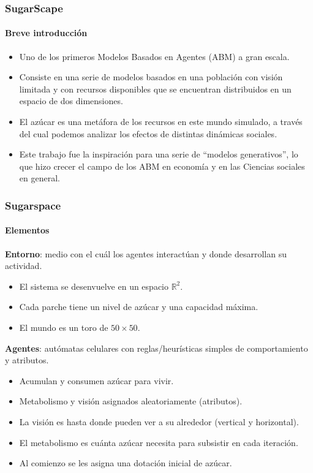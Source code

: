 \documentclass[11pt]{beamer}
\begin{document}
\begin{frame}
\frametitle{SugarScape}
\framesubtitle{Breve introducción}
\begin{itemize}
	\item Uno de los primeros Modelos Basados en Agentes (ABM) a gran escala.
	\item Consiste en una serie de modelos basados en una población con visión limitada y con recursos disponibles que se encuentran distribuidos en un espacio de dos dimensiones.
	\item El azúcar es una metáfora de los recursos en este mundo simulado, a través del cual podemos analizar los efectos de distintas dinámicas sociales.
\item Este trabajo fue la inspiración para una serie de ``modelos generativos'', lo que hizo crecer el campo de los ABM en economía y en las Ciencias sociales en general. 
\end{itemize}
\end{frame}
	


\begin{frame}
\frametitle{Sugarspace}
\framesubtitle{Elementos}

\textbf{Entorno}:
medio con el cuál los agentes interactúan y donde desarrollan su actividad.
\begin{itemize}
	\item El sistema se desenvuelve en un espacio $\mathbb{R}^2$.
	\item Cada parche tiene un nivel de azúcar y una capacidad máxima.
	\item El mundo es un toro de $50 \times 50$.
\end{itemize}

\textbf{Agentes}:
autómatas celulares con reglas/heurísticas simples de comportamiento y atributos.
\begin{itemize}
	\item Acumulan y consumen azúcar para vivir.
	\item Metabolismo y visión asignados aleatoriamente (atributos).
	\item La visión es hasta donde pueden ver a su alrededor (vertical y horizontal).
	\item El metabolismo es cuánta azúcar necesita para subsistir en cada iteración.
	\item Al comienzo se les asigna una dotación inicial de azúcar.
\end{itemize}
\end{frame}
\end{document}
